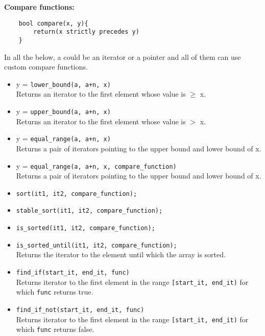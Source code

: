 \begin{mdframed}[backgroundcolor=blue!20]
\textbf{Compare functions:}
\vspace{-8pt}
\begin{verbatim}
	bool compare(x, y){
	    return(x strictly precedes y)
	}
\end{verbatim}	
\end{mdframed}

In all the below, a could be an iterator or a pointer and all of them can use custom  compare functions.\\

\begin{itemize}
\item y = \texttt{lower\_bound(a, a+n, x)}\\
Returns an iterator to the first element whose value is $\geq$ x.\\
\item y = \texttt{upper\_bound(a, a+n, x)}\\
Returns an iterator to the first element whose value is $>$ x.\\
\item y = \texttt{equal\_range(a, a+n, x)}\\
Returns a pair of iterators pointing to the upper bound and lower bound of x.\\
\item y = \texttt{equal\_range(a, a+n, x, compare\_function)}\\
Returns a pair of iterators pointing to the upper bound and lower bound of x.\\
\item \texttt{sort(it1, it2, compare\_function);}
\item \texttt{stable\_sort(it1, it2, compare\_function);}
\item \texttt{is\_sorted(it1, it2, compare\_function);}
\item \texttt{is\_sorted\_until(it1, it2, compare\_function);}\\
Returns the iterator to the element until which the array is sorted.\\
\item \texttt{find\_if(start\_it, end\_it, func)}\\
Returns iterator to the first element in the range \texttt{[start\_it, end\_it)} for which \texttt{func} returns true.
\item \texttt{find\_if\_not(start\_it, end\_it, func)}\\
Returns iterator to the first element in the range \texttt{[start\_it, end\_it)} for which \texttt{func} returns false.
\end{itemize}


